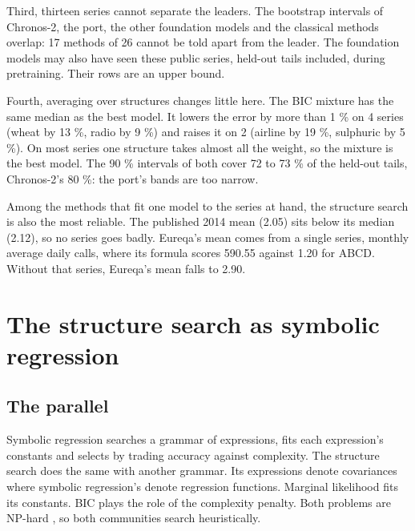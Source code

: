 \documentclass[
]{article}
\begin{document}
Third, thirteen series cannot separate the leaders. The bootstrap
intervals of Chronos-2, the port, the other foundation models and the
classical methods overlap: 17 methods of 26 cannot be told apart from
the leader. The foundation models may also have seen these public
series, held-out tails included, during pretraining. Their rows are an
upper bound.

Fourth, averaging over structures changes little here. The BIC mixture
has the same median as the best model. It lowers the error by more than
1 \% on 4 series (wheat by 13 \%, radio by 9 \%) and raises it on 2
(airline by 19 \%, sulphuric by 5 \%). On most series one structure
takes almost all the weight, so the mixture is the best model. The 90 \%
intervals of both cover 72 to 73 \% of the held-out tails, Chronos-2's
80 \%: the port's bands are too narrow.

Among the methods that fit one model to the series at hand, the
structure search is also the most reliable. The published 2014 mean
(2.05) sits below its median (2.12), so no series goes badly. Eureqa's
mean comes from a single series, monthly average daily calls, where its
formula scores 590.55 against 1.20 for ABCD. Without that series,
Eureqa's mean falls to 2.90.

\section{The structure search as symbolic
regression}\label{the-structure-search-as-symbolic-regression}

\subsection{The parallel}\label{the-parallel}

Symbolic regression \autocite{koza1992genetic} searches a grammar of
expressions, fits each expression's constants and selects by trading
accuracy against complexity. The structure search does the same with
another grammar. Its expressions denote covariances where symbolic
regression's denote regression functions. Marginal likelihood fits its
constants. BIC plays the role of the complexity penalty. Both problems
are NP-hard \autocite{virgolin2022nphard}, so both communities search
heuristically.
\end{document}
